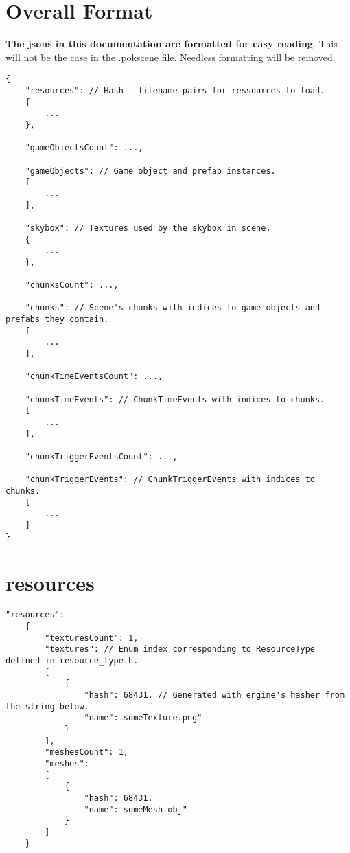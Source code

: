 \documentclass[10pt,a4paper]{article}
\begin{document}
\section{Overall Format}
\textbf{The jsons in this documentation are formatted for easy reading}. This will not be the case in the .pokscene file. Needless formatting will be removed.
\begin{lstlisting}
{
	"resources": // Hash - filename pairs for ressources to load.
	{
		...	
	},
	
	"gameObjectsCount": ...,
	
	"gameObjects": // Game object and prefab instances.
	[
		...	
	],
	
	"skybox": // Textures used by the skybox in scene.
	{
		...	
	},
	
	"chunksCount": ...,
	
	"chunks": // Scene's chunks with indices to game objects and prefabs they contain.
	[
		...	
	],
	
	"chunkTimeEventsCount": ...,
	
	"chunkTimeEvents": // ChunkTimeEvents with indices to chunks.
	[
		...	
	],
	
	"chunkTriggerEventsCount": ...,
	
	"chunkTriggerEvents": // ChunkTriggerEvents with indices to chunks.
	[
		...	
	]
}
\end{lstlisting}

\newpage

\section{resources}
\begin{lstlisting}
"resources":
	{
		"texturesCount": 1,
		"textures": // Enum index corresponding to ResourceType defined in resource_type.h.
		[
			{
				"hash": 68431, // Generated with engine's hasher from the string below.
				"name": someTexture.png"
			}		
		],
		"meshesCount": 1,
		"meshes": 
		[
			{
				"hash": 68431,
				"name": someMesh.obj"		
			}		
		]
	}
\end{lstlisting}

\newpage
\end{document}
